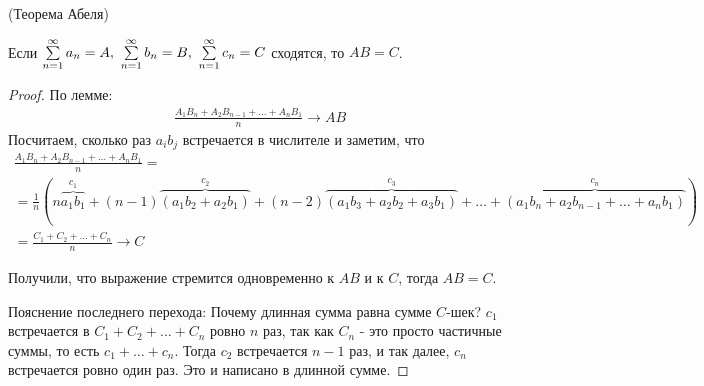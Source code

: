 \begin{theorem}
    (Теорема Абеля) 
    
    Если $\sum \limits_{n=1}^\infty a_n = A,\ \sum \limits_{n=1}^\infty b_n = B,\ \sum \limits_{n=1}^\infty c_n = C$ сходятся, то $AB = C$.
\end{theorem}
\begin{proof}
     
    По лемме:
    \begin{gather*}
     \frac{A_1B_n + A_2B_{n-1} + \ldots + A_nB_1}{n} \longrightarrow AB
    \end{gather*}
    Посчитаем, сколько раз $a_ib_j$ встречается в числителе и заметим, что 
    \begin{gather*}
        \frac{A_1B_n + A_2B_{n-1} + \ldots + A_nB_1}{n} = \\
        = \frac{1}{n} ( n\overbrace{a_1b_1}^{c_1} 
        + (n-1)\overbrace{(a_1b_2 + a_2b_1)}^{c_2} 
        + (n-2)\overbrace{(a_1b_3+a_2b_2+a_3b_1)}^{c_3} + \ldots + 
         \overbrace{(a_1b_n + a_2b_{n-1} + \ldots + a_nb_1)}^{c_n} ) \\
        = \frac{C_1 + C_2 + \ldots + C_n}{n} \to C
    \end{gather*}

    Получили, что выражение стремится одновременно к $AB$ и к $C$, тогда $AB = C$. 

    Пояснение последнего перехода: Почему длинная сумма равна сумме $C$-шек? 
    $c_1$ встречается в $C_1 + C_2 + \ldots + C_n$ ровно $n$ раз, так как $C_n$ - это просто 
    частичные суммы, то есть $c_1 + \ldots + c_n$. Тогда $c_2$ встречается $n-1$ раз, и так далее, $c_n$ встречается ровно один раз.
     Это и написано в длинной сумме.
\end{proof}